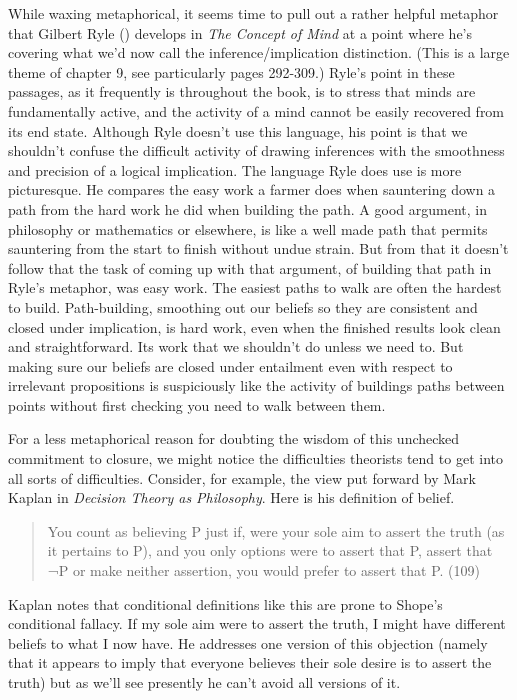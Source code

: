 \documentclass[
  10pt,
  letterpaper,
  DIV=11,
  numbers=noendperiod,
  twoside]{scrartcl}
\begin{document}
While waxing metaphorical, it seems time to pull out a rather helpful
metaphor that Gilbert Ryle () develops in
\emph{The Concept of Mind} at a point where he's covering what we'd now
call the inference/implication distinction. (This is a large theme of
chapter 9, see particularly pages 292-309.) Ryle's point in these
passages, as it frequently is throughout the book, is to stress that
minds are fundamentally active, and the activity of a mind cannot be
easily recovered from its end state. Although Ryle doesn't use this
language, his point is that we shouldn't confuse the difficult activity
of drawing inferences with the smoothness and precision of a logical
implication. The language Ryle does use is more picturesque. He compares
the easy work a farmer does when sauntering down a path from the hard
work he did when building the path. A good argument, in philosophy or
mathematics or elsewhere, is like a well made path that permits
sauntering from the start to finish without undue strain. But from that
it doesn't follow that the task of coming up with that argument, of
building that path in Ryle's metaphor, was easy work. The easiest paths
to walk are often the hardest to build. Path-building, smoothing out our
beliefs so they are consistent and closed under implication, is hard
work, even when the finished results look clean and straightforward. Its
work that we shouldn't do unless we need to. But making sure our beliefs
are closed under entailment even with respect to irrelevant propositions
is suspiciously like the activity of buildings paths between points
without first checking you need to walk between them.

For a less metaphorical reason for doubting the wisdom of this unchecked
commitment to closure, we might notice the difficulties theorists tend
to get into all sorts of difficulties. Consider, for example, the view
put forward by Mark Kaplan in \emph{Decision Theory as Philosophy}. Here
is his definition of belief.

\begin{quote}
You count as believing P just if, were your sole aim to assert the truth
(as it pertains to P), and you only options were to assert that P,
assert that ¬P or make neither assertion, you would prefer to assert
that P. (109)
\end{quote}

Kaplan notes that conditional definitions like this are prone to Shope's
conditional fallacy. If my sole aim were to assert the truth, I might
have different beliefs to what I now have. He addresses one version of
this objection (namely that it appears to imply that everyone believes
their sole desire is to assert the truth) but as we'll see presently he
can't avoid all versions of it.
\end{document}
